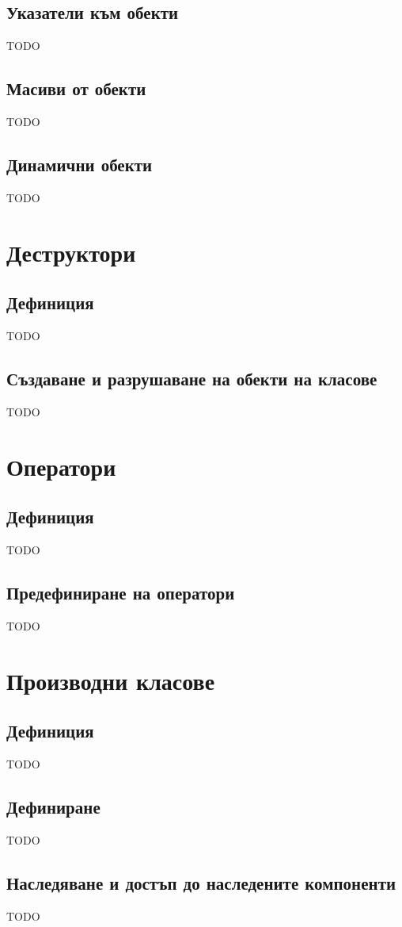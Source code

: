 \documentclass[fleqn,12pt]{article}
\begin{document}
\subsection{Указатели към обекти}
TODO

\subsection{Масиви от обекти}
TODO

\subsection{Динамични обекти}
TODO


\section{Деструктори}
\subsection{Дефиниция}
TODO

\subsection{Създаване и разрушаване на обекти на класове}
TODO


\section{Оператори}
\subsection{Дефиниция}
TODO

\subsection{Предефиниране на оператори}
TODO


\section{Производни класове}
\subsection{Дефиниция}
TODO

\subsection{Дефиниране}
TODO

\subsection{Наследяване и достъп до наследените компоненти}
TODO
\end{document}
